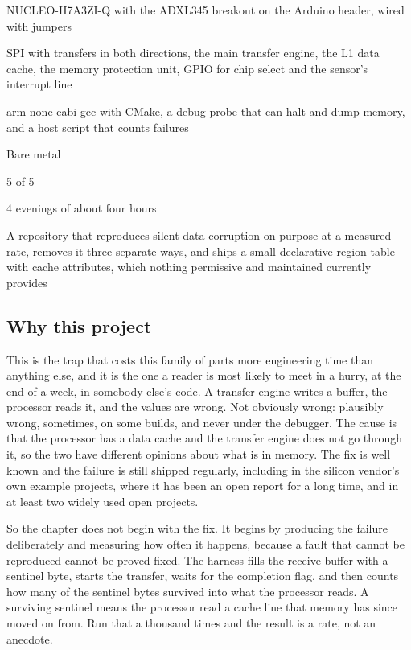 
\begin{keyfacts}
\item[Board] NUCLEO-H7A3ZI-Q with the ADXL345 breakout on the Arduino header, wired with jumpers
\item[Peripherals] SPI with transfers in both directions, the main transfer engine, the L1 data cache, the memory protection unit, GPIO for chip select and the sensor's interrupt line
\item[Toolchain] arm-none-eabi-gcc with CMake, a debug probe that can halt and dump memory, and a host script that counts failures
\item[Operating system] Bare metal
\item[Difficulty] 5 of 5
\item[Effort] 4 evenings of about four hours
\item[Deliverable] A repository that reproduces silent data corruption on purpose at a measured rate, removes it three separate ways, and ships a small declarative region table with cache attributes, which nothing permissive and maintained currently provides
\end{keyfacts}

\subsection*{Why this project}

This is the trap that costs this family of parts more engineering time than
anything else, and it is the one a reader is most likely to meet in a hurry, at
the end of a week, in somebody else's code. A transfer engine writes a buffer, the
processor reads it, and the values are wrong. Not obviously wrong: plausibly
wrong, sometimes, on some builds, and never under the debugger. The cause is
that the processor has a data cache and the transfer engine does not go through
it, so the two have different opinions about what is in memory. The fix is
well known and the failure is still shipped regularly, including in the silicon
vendor's own example projects, where it has been an open report for a long time,
and in at least two widely used open projects.

So the chapter does not begin with the fix. It begins by producing the failure
deliberately and measuring how often it happens, because a fault that cannot be
reproduced cannot be proved fixed. The harness fills the receive buffer with a
sentinel byte, starts the transfer, waits for the completion flag, and then
counts how many of the sentinel bytes survived into what the processor reads. A
surviving sentinel means the processor read a cache line that memory has since
moved on from. Run that a thousand times and the result is a rate, not an
anecdote.

